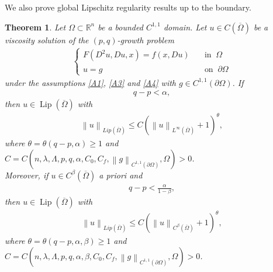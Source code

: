 \documentclass[reqno]{amsart}
\theoremstyle{plain}
\newtheorem{thm}{Theorem}[section]
\theoremstyle{definition}
\theoremstyle{remark}
\newcommand{\norm}[1]{\left\lVert#1\right\rVert}
\newcommand{\Lip}{\operatorname{Lip}}
\numberwithin{equation}{section}
\begin{document}
We also prove global Lipschitz regularity results up to the boundary.
\begin{thm} \label{Main2}
    Let $\Omega \subset \mathbb{R}^n$ be a bounded $C^{1,1}$ domain.
    Let $u \in C(\overline{\Omega})$ be a viscosity solution of the $(p,q)$-growth problem
    \begin{align*}
    \begin{cases}
        F(D^2u,Du,x) = f(x,Du) \quad &\text{in } \ \Omega \\
        u=g\quad &\text{on } \ \partial\Omega
    \end{cases}
    \end{align*}
    under the assumptions \ref{A1}, \ref{A3} and \ref{A4} with $g\in C^{1,1}(\partial\Omega)$. If
    \begin{align} \label{gapg}
        q-p< \alpha,
    \end{align}
   then $u \in \Lip(\overline{\Omega})$ with
   \begin{align*}
    \norm{u}_{Lip(\overline{\Omega})} \leq C(\norm{u}_{L^\infty(\overline{\Omega})}+1)^\theta,
   \end{align*}
   where $\theta = \theta(q-p,\alpha)\geq1$ and $C=C(n,\lambda,\Lambda,p,q,\alpha,C_0 ,C_f,\norm{g}_{C^{1,1}(\partial\Omega)}, \Omega)>0$.\\
   Moreover, if $u \in C^\beta(\overline{\Omega})$ a priori and
    \begin{align} \label{gapbg}
       q-p< \frac{\alpha}{1-\beta},
    \end{align}
    then $u \in \Lip(\overline{\Omega})$ with
   \begin{align*}
    \norm{u}_{Lip(\overline{\Omega})} \leq C(\norm{u}_{C^\beta(\overline{\Omega})}+1)^\theta,
   \end{align*}
   where $\theta = \theta(q-p,\alpha,\beta)\geq1$ and $C=C(n,\lambda,\Lambda,p,q,\alpha,\beta,C_0,C_f ,\norm{g}_{C^{1,1}(\partial\Omega)}, \Omega)>0$.
\end{thm}
\end{document}
